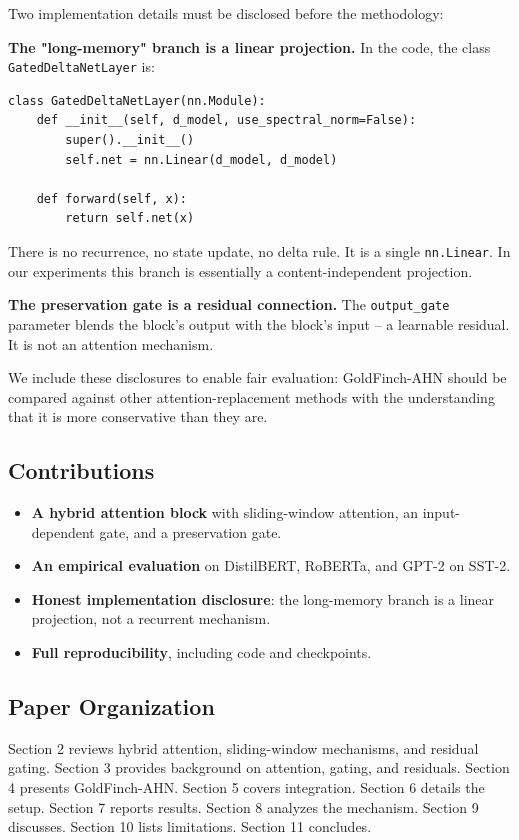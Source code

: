 Two implementation details must be disclosed before the methodology:

\textbf{The "long-memory" branch is a linear projection.} In the code, the class 
\texttt{GatedDeltaNetLayer} is:

\begin{lstlisting}
class GatedDeltaNetLayer(nn.Module):
    def __init__(self, d_model, use_spectral_norm=False):
        super().__init__()
        self.net = nn.Linear(d_model, d_model)

    def forward(self, x):
        return self.net(x)
\end{lstlisting}

There is no recurrence, no state update, no delta rule. It is a single 
\texttt{nn.Linear}. In our experiments this branch is essentially a 
content-independent projection.

\textbf{The preservation gate is a residual connection.} The \texttt{output\_gate} 
parameter blends the block's output with the block's input -- a learnable 
residual. It is not an attention mechanism.

We include these disclosures to enable fair evaluation: GoldFinch-AHN 
should be compared against other attention-replacement methods with the 
understanding that it is more conservative than they are.

\subsection{Contributions}

\begin{itemize}
\item \textbf{A hybrid attention block} with sliding-window attention, an input-dependent
  gate, and a preservation gate.
\item \textbf{An empirical evaluation} on DistilBERT, RoBERTa, and GPT-2 on SST-2.
\item \textbf{Honest implementation disclosure}: the long-memory branch is a linear
  projection, not a recurrent mechanism.
\item \textbf{Full reproducibility}, including code and checkpoints.

\end{itemize}
\subsection{Paper Organization}

Section 2 reviews hybrid attention, sliding-window mechanisms, and residual 
gating. Section 3 provides background on attention, gating, and residuals. 
Section 4 presents GoldFinch-AHN. Section 5 covers integration. Section 6 
details the setup. Section 7 reports results. Section 8 analyzes the 
mechanism. Section 9 discusses. Section 10 lists limitations. Section 11 
concludes.



